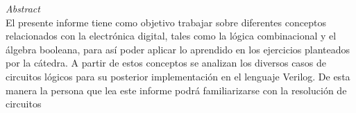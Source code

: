 
\textit{Abstract}\\
El presente informe tiene como objetivo trabajar sobre diferentes conceptos relacionados con la electr\'onica digital, 
tales como la l\'ogica combinacional y el \'algebra booleana, para as\'i poder aplicar lo aprendido en los ejercicios planteados por la c\'atedra.
A partir de estos conceptos se analizan los diversos casos de circuitos l\'ogicos para su posterior implementaci\'on en el lenguaje Verilog. 
De esta manera la persona que lea este informe podr\'a familiarizarse con la resoluci\'on de circuitos  


